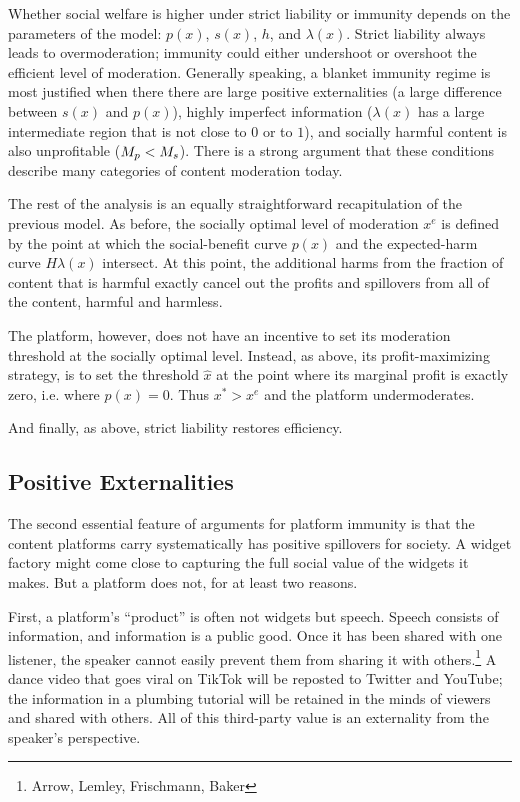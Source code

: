 Whether social welfare is higher under strict liability or immunity depends on the parameters of the model:  $p(x)$, $s(x)$, $h$, and $\lambda(x)$. Strict liability always leads to overmoderation; immunity could either undershoot or overshoot the efficient level of moderation. Generally speaking, a blanket immunity regime is most justified when there there are large positive externalities (a large difference between $s(x)$ and $p(x)$), highly imperfect information ($\lambda(x)$ has a large intermediate region that is not close to $0$ or to $1$), and socially harmful content is also unprofitable ($M_p < M_s$).
 There is a strong argument that these conditions describe many categories of content moderation today.













The rest of the analysis is an equally straightforward recapitulation of the previous model. As before, the socially optimal level of moderation $x^e$ is defined by the point at which the social-benefit curve $p(x)$ and the expected-harm curve $H\lambda(x)$ intersect. At this point, the additional harms from the fraction of content that is harmful exactly cancel out the profits and spillovers from all of the content, harmful and harmless.

The platform, however, does not have an incentive to set its moderation threshold at the socially optimal level. Instead, as above, its profit-maximizing strategy, is to set the threshold $\hat{x}$ at the point where its marginal profit is exactly zero, i.e. where $p(x) = 0$. Thus $x^* > x^e$ and the platform undermoderates.

And finally, as above, strict liability restores efficiency. 

\subsection{Positive Externalities}

The second essential feature of arguments for platform immunity is that the content platforms carry systematically has positive spillovers for society. A widget factory might come close to capturing the full social value of the widgets it makes. But a platform does not, for at least two reasons.

First, a platform's ``product'' is often not widgets but speech. Speech consists of information, and information is a public good. Once it has been shared with one listener, the speaker cannot easily prevent them from sharing it with others.\footnote{Arrow, Lemley, Frischmann, Baker} A dance video that goes viral on TikTok will be reposted to Twitter and YouTube; the information in a plumbing tutorial will be retained in the minds of viewers and shared with others. All of this third-party value is an externality from the speaker's perspective.

